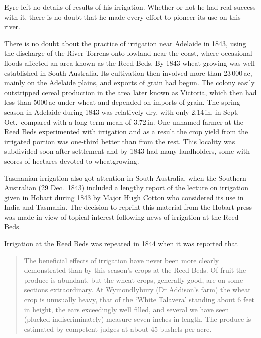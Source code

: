 Eyre left no details of results of his irrigation.  Whether or not he
had real success with it, there is no doubt that he made every effort
to pioneer its use on this river.

There is no doubt about the practice of irrigation near Adelaide in
1843, using the discharge of the River Torrens onto lowland near the
coast, where occasional floods affected an area known as the Reed
Beds.  By 1843 wheat-growing was well established in South Australia.
Its cultivation then involved more than 23\,000\,ac, mainly on the
Adelaide plains, and exports of grain had begun.  The colony easily
outstripped cereal production in the area later known as Victoria,
which then had less than 5000\,ac under wheat and depended on
imports of grain.  The spring season in Adelaide during 1843 was
relatively dry, with only 2.14\,in. in Sept.--Oct.\ compared with a
long-term mean of 3.72\,in.  One unnamed farmer at the Reed Beds experimented with
irrigation and as a result the crop yield from the irrigated portion
was one-third better than from the rest.  This locality was subdivided soon after settlement
and by 1843 had many landholders, some with scores of hectares devoted
to wheatgrowing.

Tasmanian irrigation also got attention in South Australia, when the
Southern Australian (29 Dec.\ 1843) included a lengthy report of
the lecture on irrigation given in Hobart during 1843 by Major Hugh
Cotton who considered its use in India and Tasmania.  The decision to
reprint this material from the Hobart press was made in view of
topical interest following news of irrigation at the Reed Beds.

Irrigation at the Reed Beds was repeated in 1844 when it was  reported that
\begin{quote}
	The beneficial effects of irrigation have never been more
	clearly demonstrated than by this season's crops at the Reed
	Beds.  Of fruit the produce is abundant, but the wheat crops,
	generally good, are on some sections extraordinary. At
	Wymondlybury (Dr Addison's farm) the wheat crop is unusually
	heavy, that of the `White Talavera' standing about 6 feet in
	height, the ears exceedingly well filled, and several we have
	seen (plucked indiscriminately) measure seven inches in
	length.  The produce is estimated by competent judges at about
	45 bushels per acre.
\end{quote}

